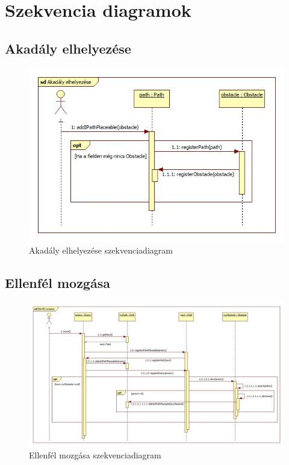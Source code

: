 \section{Szekvencia diagramok}
\subsection{Akadály elhelyezése}
\begin{figure}[H]
\begin{center}
\includegraphics[width=17cm]{chapters/chapter03/images/Akadaly_elhelyezese.jpg}
\caption{Akadály elhelyezése szekvenciadiagram}
\label{fig:Akadály_elhelyezése}
\end{center}
\end{figure}

\subsection{Ellenfél mozgása}
\begin{figure}[H]
\begin{center}
\includegraphics[width=17cm]{chapters/chapter03/images/Ellenfel_mozgasa.jpg}
\caption{Ellenfél mozgása szekvenciadiagram}
\label{fig:Ellenfél_mozgása}
\end{center}
\end{figure}

